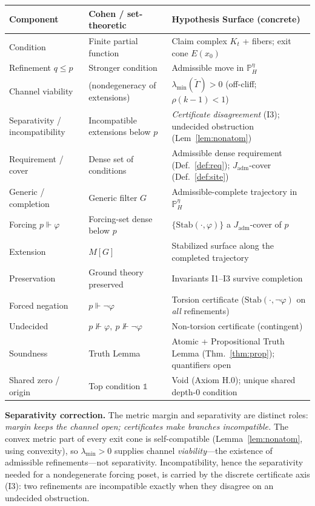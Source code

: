 \documentclass[11pt]{article}
\theoremstyle{definition}
\theoremstyle{remark}
\newcommand{\PHeta}{\mathbb{P}_{H}^{\eta}}
\newcommand{\refines}{\leq}
\newcommand{\Gam}{\tilde{\Gamma}}
\newcommand{\lmin}{\lambda_{\min}}
\newcommand{\Stab}{\mathrm{Stab}}
\newcommand{\Kt}{K_{t}}
\newcommand{\Jadm}{J_{\mathrm{adm}}}
\begin{document}
\begin{center}
\renewcommand{\arraystretch}{1.25}
\begin{tabular}{@{}p{} p{} p{}@{}}
\toprule
\textbf{Component} & \textbf{Cohen / set-theoretic} & \textbf{Hypothesis Surface (concrete)} \\
\midrule
Condition & Finite partial function & Claim complex $\Kt$ + fibers; exit cone $E(x_0)$ \\
Refinement $q\refines p$ & Stronger condition & Admissible move in $\PHeta$ \\
Channel viability & (nondegeneracy of extensions) & $\lmin(\Gam)>0$ (off-cliff; $\rho(k-1)<1$) \\
Separativity / incompatibility & Incompatible extensions below $p$ & \emph{Certificate disagreement} (I3); undecided obstruction (Lem~\ref{lem:nonatom}) \\
Requirement / cover & Dense set of conditions & Admissible dense requirement (Def.~\ref{def:req}); $\Jadm$-cover (Def.~\ref{def:site}) \\
Generic / completion & Generic filter $G$ & Admissible-complete trajectory in $\PHeta$ \\
Forcing $p\Vdash\varphi$ & Forcing-set dense below $p$ & $\{\Stab(\cdot,\varphi)\}$ a $\Jadm$-cover of $p$ \\
Extension & $M[G]$ & Stabilized surface along the completed trajectory \\
Preservation & Ground theory preserved & Invariants I1--I3 survive completion \\
Forced negation & $p\Vdash\neg\varphi$ & Torsion certificate ($\Stab(\cdot,\neg\varphi)$ on \emph{all} refinements) \\
Undecided & $p\nVdash\varphi,\ p\nVdash\neg\varphi$ & Non-torsion certificate (contingent) \\
Soundness & Truth Lemma & Atomic + Propositional Truth Lemma (Thm.~\ref{thm:prop}); quantifiers open \\
Shared zero / origin & Top condition $\mathbb{1}$ & Void (Axiom H.0); unique shared depth-$0$ condition \\
\bottomrule
\end{tabular}
\end{center}

\noindent\textbf{Separativity correction.} The metric margin and separativity are distinct roles:
\emph{margin keeps the channel open; certificates make branches incompatible.} The convex metric part
of every exit cone is self-compatible (Lemma~\ref{lem:nonatom}, using convexity), so $\lmin>0$
supplies channel \emph{viability}---the existence of admissible refinements---not separativity.
Incompatibility, hence the separativity needed for a nondegenerate forcing poset, is carried by the
discrete certificate axis (I3): two refinements are incompatible exactly when they disagree on an
undecided obstruction.
\end{document}
